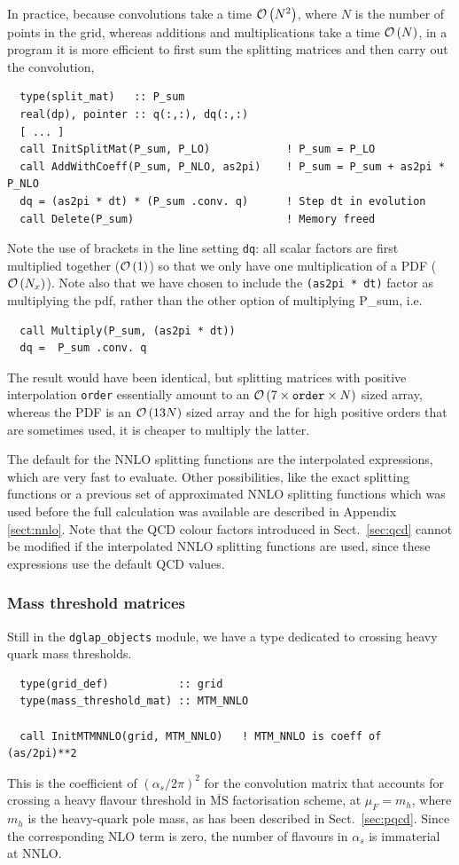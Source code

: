 \documentclass[12pt]{article}
\newcommand{\as}{\alpha_s}
\newcommand{\ie}{i.e.\ }
\newcommand{\MSbar}{\overline{\mathrm{MS}}}
\newcommand{\ttt}[1]{\texttt{#1}}
\newcommand{\order}[1]{{\cal O}\left(#1\right)}
\begin{document}
In practice, because convolutions take a time $\order{N^2}$, where
$N$ is the number of points in the grid, whereas
additions and multiplications take a time $\order{N}$, in a program it
is more efficient to first sum the splitting matrices and then carry out the
convolution,
\begin{lstlisting}
  type(split_mat)   :: P_sum
  real(dp), pointer :: q(:,:), dq(:,:)
  [ ... ]
  call InitSplitMat(P_sum, P_LO)            ! P_sum = P_LO
  call AddWithCoeff(P_sum, P_NLO, as2pi)    ! P_sum = P_sum + as2pi * P_NLO
  dq = (as2pi * dt) * (P_sum .conv. q)      ! Step dt in evolution
  call Delete(P_sum)                        ! Memory freed
\end{lstlisting}
Note the use of brackets in the line setting \ttt{dq}: all scalar
factors are first multiplied together ($\order{1}$) so that we only
have one multiplication of a PDF ($\order{N_x}$). Note also that we have
chosen to include the \ttt{(as2pi * dt)} factor as multiplying the
pdf, rather than the other option of multiplying {P\_sum}, \ie 
\begin{lstlisting}
  call Multiply(P_sum, (as2pi * dt))
  dq =  P_sum .conv. q
\end{lstlisting}
The result would have been identical, but splitting matrices with
positive interpolation \ttt{order} essentially amount to an
$\order{7\times \ttt{order} \times N}$ sized array, whereas the PDF is
an $\order{13 N}$ sized array and the for high positive orders that
are sometimes used, it is cheaper to multiply the latter. 

The default for the NNLO splitting functions are the interpolated
expressions, which are very fast
to evaluate. Other possibilities, like
the exact splitting functions or a previous set of approximated NNLO
splitting functions which was used before the full
calculation was available are described in Appendix \ref{sect:nnlo}.
Note that the QCD colour factors introduced in Sect.~\ref{sec:qcd}
cannot be modified if the interpolated NNLO splitting functions
are used, since these expressions use the default QCD values.





\subsubsection{Mass threshold matrices}
\label{sec:mtm}

Still in the \ttt{dglap\_objects} module, we have a type dedicated to
crossing heavy quark mass thresholds.
\begin{lstlisting}
  type(grid_def)           :: grid
  type(mass_threshold_mat) :: MTM_NNLO

  call InitMTMNNLO(grid, MTM_NNLO)   ! MTM_NNLO is coeff of (as/2pi)**2
\end{lstlisting}
This is the coefficient  of $(\as/2\pi)^2$ for the convolution matrix that
accounts for crossing a heavy flavour threshold in $\MSbar$
factorisation scheme, at $\mu_F = m_h$, where
$m_h$ is the heavy-quark pole mass, as has
been described in Sect.~\ref{sec:pqcd}. Since the
corresponding NLO term is zero, the number of flavours in $\as$ is
immaterial at NNLO. 
\end{document}
